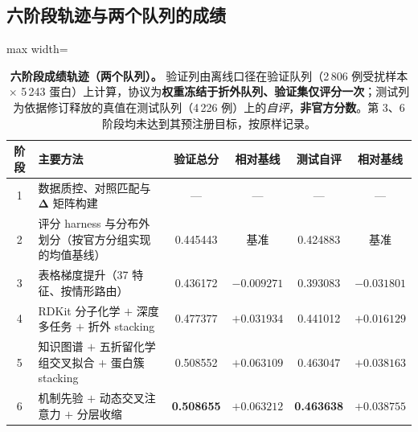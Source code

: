\subsection{六阶段轨迹与两个队列的成绩}

\begin{table}[H]
\centering\small
\caption{\textbf{六阶段成绩轨迹（两个队列）。} 验证列由离线口径在验证队列（2\,806 例受扰样本 $\times$ 5\,243 蛋白）上计算，协议为\textbf{权重冻结于折外队列、验证集仅评分一次}；\NEW{}测试列为依据修订释放的真值在测试队列（4\,226 例）上的\emph{自评}，\textbf{非官方分数}。第 3、6 阶段均未达到其预注册目标，按原样记录。}
\label{tab:headline}
\begin{adjustbox}{max width=\textwidth}
\begin{tabular}{clcccc}
\toprule
阶段 & 主要方法 & 验证总分 & 相对基线 & 测试自评 & 相对基线 \\
\midrule
1 & 数据质控、对照匹配与 $\bm{\Delta}$ 矩阵构建 & --- & --- & --- & --- \\
2 & 评分 harness 与分布外划分（按官方分组实现的均值基线） & 0.445443 & 基准 & 0.424883 & 基准 \\
3 & 表格梯度提升（37 特征、按情形路由） & 0.436172 & $-0.009271$ & 0.393083 & $-0.031801$ \\
4 & RDKit 分子化学 $+$ 深度多任务 $+$ 折外 stacking & 0.477377 & $+0.031934$ & 0.441012 & $+0.016129$ \\
5 & 知识图谱 $+$ 五折留化学组交叉拟合 $+$ 蛋白簇 stacking & 0.508552 & $+0.063109$ & 0.463047 & $+0.038163$ \\
6 & 机制先验 $+$ 动态交叉注意力 $+$ 分层收缩 & \textbf{0.508655} & $\bm{+0.063212}$ & \textbf{0.463638} & $\bm{+0.038755}$ \\
\bottomrule
\end{tabular}
\end{adjustbox}
\end{table}

